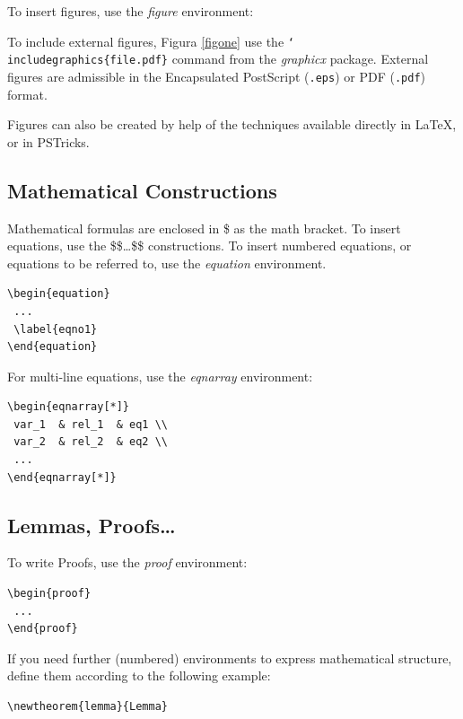 \documentclass{cai}
\def\bs#1{{\tt\char`\\#1}}
\begin{document}
To insert figures, use the \textit{figure} environment:



To include external figures, Figura \ref{figone} use the \bs{includegraphics\{file.pdf\}} command from the \textit{graphicx}
package. External figures are admissible in the Encapsulated Post\-Script (\texttt{.eps}) or PDF (\texttt{.pdf}) format.

Figures can also be created by help of the techniques available directly in \LaTeX, or in PSTricks.

\subsection{Mathematical Constructions}

Mathematical formulas are enclosed in \$ as the math bracket. To insert equations, use the \$\$\dots\$\$
constructions. To insert numbered equations, or equations to be referred to, use the \textit{equation}
environment.
\begin{verbatim}
\begin{equation}
 ...
 \label{eqno1}
\end{equation}
\end{verbatim}
For multi-line equations, use the \textit{eqnarray} environment:
\begin{verbatim}
\begin{eqnarray[*]}
 var_1  & rel_1  & eq1 \\
 var_2  & rel_2  & eq2 \\
 ...
\end{eqnarray[*]}
\end{verbatim}

\subsection{Lemmas, Proofs\dots}

To write Proofs, use the \textit{proof} environment:

\begin{verbatim}
\begin{proof}
 ...
\end{proof}
\end{verbatim}

If you need further (numbered) environments to express mathematical structure, define them according to the
following example:
\newtheorem{lemma}{Lemma}
\begin{verbatim}
\newtheorem{lemma}{Lemma}
\end{verbatim}
\end{document}
